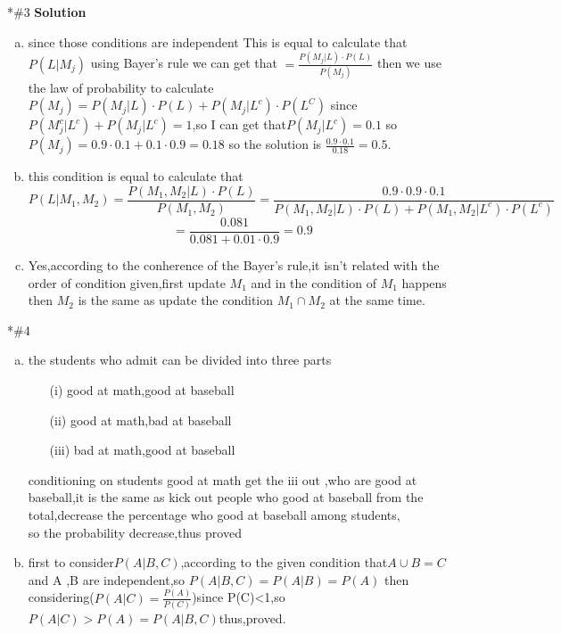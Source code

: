\documentclass{article}
\newcommand{\solution}{\textbf{\Large Solution}}
\begin{document}
\begin{homeworkProblem}*{\#3}
\solution
\\
{\large
\begin{enumerate}[(a)]
\item since those conditions are independent
This is equal to calculate that $P(L|M_j)$ using Bayer's rule we can get that $=\frac{P(M_j|L)\cdot P(L)}{P(M_j)}$
then we use the law of probability to calculate $P(M_j)=P(M_j|L)\cdot P(L)+P(M_j|L^c)\cdot P(L^C)$ since $P(M_j^c|L^c)+P(M_j|L^c)=1$,so I can get that$P(M_j|L^c)=0.1$ so $P(M_j)=0.9\cdot0.1+0.1\cdot 0.9=0.18$
so the solution is $\frac{0.9\cdot 0.1}{0.18}=0.5.$
\item  this condition is equal to calculate that $$P(L|M_1,M_2)=\frac{P(M_1,M_2|L)\cdot P(L)}{P(M_1,M_2)}=
\frac{0.9\cdot 0.9\cdot 0.1}{P(M_1,M_2|L)
\cdot P(L)+P(M_1,M_2|L^c)\cdot P(L^c)}$$
$$
=\frac{0.081}{0.081+0.01\cdot 0.9}=0.9$$
\item Yes,according to the conherence of the Bayer's rule,it isn't related with the order of condition given,first update $M_1$ and in the condition of $M_1$ happens then $M_2$ is the same as
update the condition $M_1 \cap M_2$ at the same time.
\end{enumerate}
}

\end{homeworkProblem}
\begin{homeworkProblem}*{\#4}
\begin{enumerate}[(a)]
    \item 
    the students who admit can be divided into three parts

\begin{enumerate}
    \item[(i)] good at math,good at baseball
    \item[(ii)] good at math,bad at  baseball
    \item[(iii)] bad at math,good at baseball  
\end{enumerate}
conditioning on students good at math get the iii out ,who are good at baseball,it is the same as kick out people who good at baseball from the total,decrease the percentage who good at baseball among students,\\
so the probability decrease,thus proved
\item first to consider$P(A|B,C)$,according to the given condition that$A\cup B=C$and A ,B are independent,so $P(A|B,C)=P(A|B)=P(A)$
then considering($P(A|C)=\frac{P(A)}{P(C)}$)since P(C)<1,so $P(A|C)>P(A)=P(A|B,C)$thus,proved.
\end{enumerate}
\end{homeworkProblem}
\end{document}
